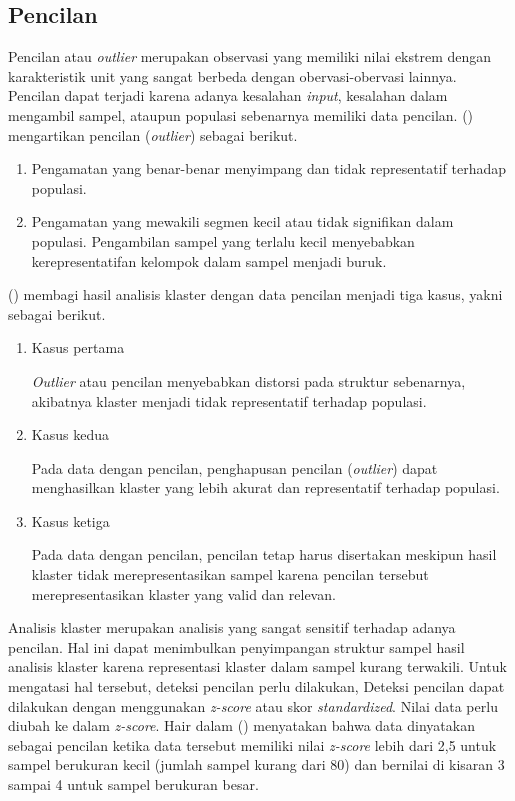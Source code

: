 \subsection{Pencilan}
Pencilan atau \textit{outlier} merupakan observasi yang memiliki nilai ekstrem dengan karakteristik unit yang sangat berbeda dengan obervasi-obervasi lainnya. Pencilan dapat terjadi karena adanya kesalahan \textit{input}, kesalahan dalam mengambil sampel, ataupun populasi sebenarnya memiliki data pencilan. \citeauthor{hair} (\citeyear{hair}) mengartikan pencilan (\textit{outlier}) sebagai berikut.
\begin{enumerate}
    \item Pengamatan yang benar-benar menyimpang dan tidak representatif terhadap populasi.
    \item Pengamatan yang mewakili segmen kecil atau tidak signifikan dalam populasi. Pengambilan sampel yang terlalu kecil menyebabkan kerepresentatifan kelompok dalam sampel menjadi buruk.
\end{enumerate}
\par \citeauthor{hair} (\citeyear{hair}) membagi hasil analisis klaster dengan data pencilan menjadi tiga kasus, yakni sebagai berikut.
\begin{enumerate}
    \item Kasus pertama
            \par \textit{Outlier} atau pencilan menyebabkan distorsi pada struktur sebenarnya, akibatnya klaster menjadi tidak representatif terhadap populasi.
    \item Kasus kedua
            \par Pada data dengan pencilan, penghapusan pencilan (\textit{outlier}) dapat menghasilkan klaster yang lebih akurat dan representatif terhadap populasi.
    \item Kasus ketiga
            \par Pada data dengan pencilan, pencilan tetap harus disertakan meskipun hasil klaster tidak merepresentasikan sampel karena pencilan tersebut merepresentasikan klaster yang valid dan relevan.
\end{enumerate}
\par Analisis klaster merupakan analisis yang sangat sensitif terhadap adanya pencilan. Hal ini dapat menimbulkan penyimpangan struktur sampel hasil analisis klaster karena representasi klaster dalam sampel kurang terwakili. Untuk mengatasi hal tersebut, deteksi pencilan perlu dilakukan, Deteksi pencilan dapat dilakukan dengan menggunakan \textit{z-score} atau skor \textit{standardized}. Nilai data perlu diubah ke dalam \textit{z-score}. Hair dalam \citeauthor{ghozali} (\citeyear{ghozali}) menyatakan bahwa data dinyatakan sebagai pencilan ketika data tersebut memiliki nilai \textit{z-score} lebih dari 2,5 untuk sampel berukuran kecil (jumlah sampel kurang dari 80) dan bernilai di kisaran 3 sampai 4 untuk sampel berukuran besar.

